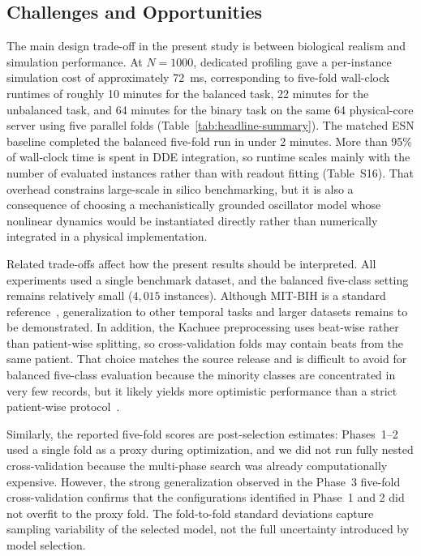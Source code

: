 \documentclass[journal=asbcd6,manuscript=article,keywords]{achemso}
\begin{document}
\subsection{Challenges and Opportunities}\label{sec:challenges}
The main design trade-off in the present study is between biological realism and simulation performance. 
At $N = 1000$, dedicated profiling gave a per-instance simulation cost of approximately \SI{72}{\milli\second}, corresponding to five-fold wall-clock runtimes of roughly 10 minutes for the balanced task, 22 minutes for the unbalanced task, and 64 minutes for the binary task on the same 64 physical-core server using five parallel folds (Table~\ref{tab:headline-summary}). 
The matched ESN baseline completed the balanced five-fold run in under 2 minutes. 
More than 95\% of wall-clock time is spent in DDE integration, so runtime scales mainly with the number of evaluated instances rather than with readout fitting (Table~S16). 
That overhead constrains large-scale in silico benchmarking, but it is also a consequence of choosing a mechanistically grounded oscillator model whose nonlinear dynamics would be instantiated directly rather than numerically integrated in a physical implementation.

Related trade-offs affect how the present results should be interpreted. 
All experiments used a single benchmark dataset, and the balanced five-class setting remains relatively small ($4{,}015$ instances). 
Although MIT-BIH is a standard reference~\cite{Moody2001}, generalization to other temporal tasks and larger datasets remains to be demonstrated. 
In addition, the Kachuee preprocessing uses beat-wise rather than patient-wise splitting, so cross-validation folds may contain beats from the same patient. 
That choice matches the source release and is difficult to avoid for balanced five-class evaluation because the minority classes are concentrated in very few records, but it likely yields more optimistic performance than a strict patient-wise protocol~\cite{deChazal2004}.

Similarly, the reported five-fold scores are post-selection estimates: Phases~1--2 used a single fold as a proxy during optimization, and we did not run fully nested cross-validation because the multi-phase search was already computationally expensive. 
However, the strong generalization observed in the Phase~3 five-fold cross-validation confirms that the configurations identified in Phase~1 and 2 did not overfit to the proxy fold. 
The fold-to-fold standard deviations capture sampling variability of the selected model, not the full uncertainty introduced by model selection.
\end{document}
